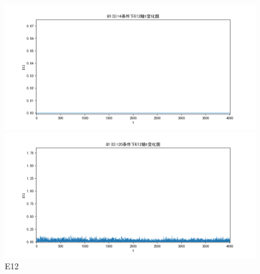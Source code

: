 \documentclass[10pt, a4paper]{article}
\begin{document}
    \begin{figure}[H]
        \begin{minipage}[t]{0.49\textwidth}
            \centering
            \includegraphics[width=\textwidth]{./q5_pics/cmp/E12.png}
        \end{minipage}
        \begin{minipage}[t]{0.49\textwidth}
            \centering
            \includegraphics[width=\textwidth]{./q5_pics/exp/E12.png}
        \end{minipage}
        \caption{E12}\label{fig:E12 in q5}
    \end{figure}
\end{document}
